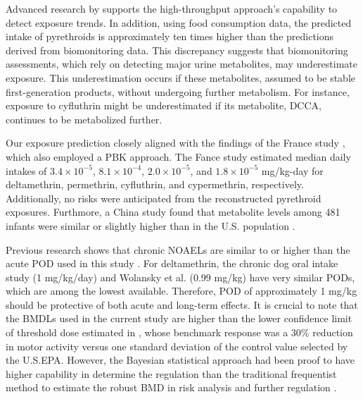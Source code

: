 \documentclass[toxics,article,submit,pdftex,moreauthors]{Definitions/mdpi}
\begin{document}
Advanced research by \citet{stanfield2024characterizing} supports the
high-throughput approach's capability to detect exposure trends. In
addition, using food consumption data, the predicted intake of
pyrethroids is approximately ten times higher than the predictions
derived from biomonitoring data. This discrepancy suggests that
biomonitoring assessments, which rely on detecting major urine
metabolites, may underestimate exposure. This underestimation occurs if
these metabolites, assumed to be stable first-generation products,
without undergoing further metabolism. For instance, exposure to
cyfluthrin might be underestimated if its metabolite, DCCA, continues to
be metabolized further.

Our exposure prediction closely aligned with the findings of the France study
\citep{quindroit2021estimating}, which also employed a PBK approach. The Fance study estimated median daily intakes of 
\(3.4 \times 10^{-5}\), \(8.1 \times 10^{-4}\), \(2.0 \times 10^{-5}\), and
\(1.8 \times 10^{-5}\) mg/kg-day for deltamethrin, permethrin, cyfluthrin, and
cypermethrin, respectively. Additionally, no risks were anticipated from the
reconstructed pyrethroid exposures. Furthmore, a China study found that
metabolite levels among 481 infants were similar or slightly higher than in the
U.S. population \citep{wu2013urinary}.

Previous research shows that chronic NOAELs are similar to or higher
than the acute POD used in this study \citep{us2017deltamethrin}.
For deltamethrin, the chronic dog oral intake study (1 mg/kg/day) and
Wolansky et al. \citep{wolansky_relative_2006} (0.99 mg/kg) have very
similar PODs, which are among the lowest available. Therefore, POD of
approximately 1 mg/kg should be protective of both acute and long-term
effects. It is crucial to note that the BMDLs used in the current study
are higher than the lower confidence limit of threshold dose estimated
in \citep{wolansky_relative_2006}, whose benchmark response was a 30\%
reduction in motor activity versus one standard deviation of the control
value selected by the U.S.EPA. However, the Bayesian statistical
approach had been proof to have higher capability in determine the
regulation than the traditional frequentist method to estimate the
robust BMD in risk analysis and further regulation
\citep{desai_role_2024}.
\end{document}

